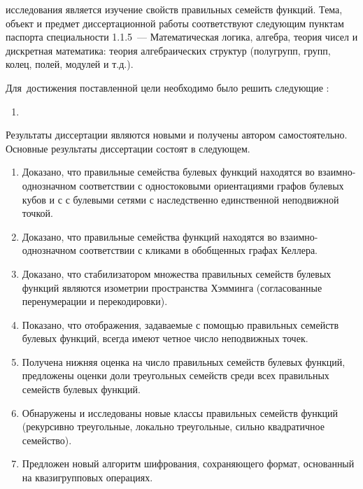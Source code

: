 

\ifsynopsis
\else
\fi

{\aim} исследования является изучение свойств правильных семейств функций.%
Тема, объект и предмет диссертационной работы соответствуют следующим пунктам паспорта специальности 1.1.5~--- Математическая логика, алгебра, теория чисел и дискретная математика: теория алгебраических структур (полугрупп, групп, колец, полей, модулей и т.д.).

Для~достижения поставленной цели необходимо было решить следующие {\tasks}:
\begin{enumerate}[beginpenalty=10000] %
  \item {}
\end{enumerate}


{\novelty}
Результаты диссертации являются новыми и получены автором самостоятельно. 
Основные результаты диссертации состоят в следующем.
\begin{enumerate}[beginpenalty=10000] %
  \item Доказано, что правильные семейства булевых функций находятся во взаимно-однозначном соответствии с одностоковыми ориентациями графов булевых кубов и с с булевыми сетями с наследственно единственной неподвижной точкой.
  \item Доказано, что правильные семейства функций находятся во взаимно-однозначном соответствии с кликами в обобщенных графах Келлера.
  \item Доказано, что стабилизатором множества правильных семейств булевых функций являются изометрии пространства Хэмминга (согласованные перенумерации и перекодировки).
  \item Показано, что отображения, задаваемые с помощью правильных семейств булевых функций, всегда имеют четное число неподвижных точек.
  \item Получена нижняя оценка на число правильных семейств булевых функций, предложены оценки доли треугольных семейств среди всех правильных семейств булевых функций.
  \item Обнаружены и исследованы новые классы правильных семейств функций (рекурсивно треугольные, локально треугольные, сильно квадратичное семейство).
  \item Предложен новый алгоритм шифрования, сохраняющего формат, основанный на квазигрупповых операциях.
\end{enumerate}

